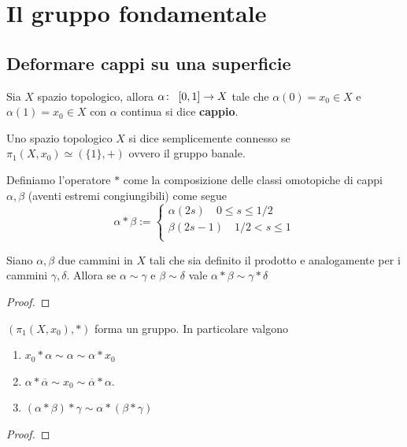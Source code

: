 \newpage
\section{Il gruppo fondamentale}
\subsection{\textcolor{TopAlg}{\textbf{Deformare cappi su una superficie}}}

\begin{definition}
	Sia $X$ spazio topologico, allora $\alpha \colon\ \left[0,1\right] \rightarrow X$ tale che $\alpha(0) = x_0 \in X$ e $\alpha(1) = x_0 \in X$ con $\alpha$ continua si dice \textbf{cappio}.
\end{definition}

\begin{definition}
	Uno spazio topologico $X$ si dice semplicemente connesso se $\pi_1(X, x_0) \simeq (\{1\}, +)$ ovvero il gruppo banale. 
 \end{definition}

\begin{definition}
	Definiamo l'operatore $*$ come la composizione delle classi omotopiche di cappi $\alpha, \beta$ (aventi estremi congiungibili) come segue
	\begin{equation*}
	\alpha * \beta :=
	\begin{cases}
		\alpha(2s) \quad 0 \le s \le 1/2 \\
		\beta(2s - 1) \quad 1/2 < s \le 1 \\ 
	\end{cases}
	\end{equation*}
\end{definition}

\begin{theorem}
	Siano $\alpha, \beta$ due cammini in $X$ tali che sia definito il prodotto e analogamente per i cammini $\gamma, \delta$. Allora se $\alpha \sim \gamma$ e $\beta \sim \delta$ vale $\alpha * \beta \sim \gamma * \delta$
\end{theorem}
\begin{proof}
\end{proof}

\begin{theorem}
	$(\pi_1(X, x_0), *)$ forma un gruppo. In particolare valgono
	\begin{enumerate}
		\item $x_0 * \alpha \sim \alpha \sim \alpha * x_0$
		\item $\alpha * \overline{\alpha} \sim x_0 \sim \overline{\alpha} * \alpha$.
		\item $(\alpha * \beta) * \gamma \sim \alpha * (\beta * \gamma)$
	\end{enumerate} 
\end{theorem}
\begin{proof}
\end{proof}

